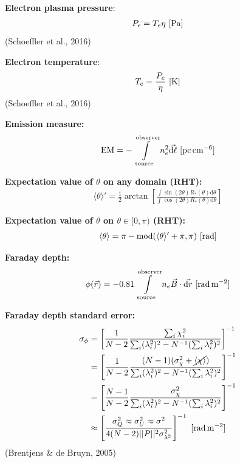 \documentclass[a4paper,10pt]{article}
\begin{document}
{\noindent}\textbf{Electron plasma pressure}:
\begin{align*}
    P_e = T_e \eta ~ [{\rm Pa}]
\end{align*}
(Schoeffler et al., 2016)

{\noindent}\textbf{Electron temperature}:
\begin{align*}
    T_e = \frac{P_e}{\eta} ~ [{\rm K}]
\end{align*}
(Schoeffler et al., 2016)

{\noindent}\textbf{Emission measure:}
\begin{align*}
    {\rm EM} = -\int\limits_\mathrm{source}^\mathrm{observer} n_e^2\vec{{\rm d}\ell} ~ [{\rm pc\,cm^{-6}}]
\end{align*}

{\noindent}\textbf{Expectation value of $\theta$ on any domain (RHT):}
\begin{align*}
    \langle\theta\rangle' = \frac{1}{2}\arctan \left[\frac{\int\sin(2\theta)R_*(\theta)\mathrm{d}\theta}{\int\cos(2\theta)R_*(\theta)\mathrm{d}\theta}\right]
\end{align*}

{\noindent}\textbf{Expectation value of $\theta$ on $\theta\in[0,\pi)$ (RHT):}
\begin{align*}
    \langle\theta\rangle = \pi - {\rm mod}(\langle\theta\rangle'+\pi,\pi) ~ [{\rm rad}]
\end{align*}

{\noindent}\textbf{Faraday depth:} 
\begin{align*}
    \phi(\vec{r}) = -0.81 \int\limits_\mathrm{source}^\mathrm{observer}n_e\vec{B}\cdot\vec{{\rm d}r} ~ [{\rm rad\,m^{-2}}]
\end{align*}

{\noindent}\textbf{Faraday depth standard error:}
\begin{align*}
\sigma_\phi &= \left[ \dfrac{1}{N-2} \dfrac{\sum_i\chi_i^2}{\sum_i(\lambda_i^2)^2 - N^{-1}(\sum_i\lambda_i^2)^2} \right]^{-1} \\
&= \left[ \dfrac{1}{N-2} \dfrac{(N-1)(\sigma_\chi^2 + \cancel{\langle\chi\rangle})}{\sum_i(\lambda_i^2)^2 - N^{-1}(\sum_i\lambda_i^2)^2} \right]^{-1} \\
&= \left[ \dfrac{N-1}{N-2} \dfrac{\sigma_\chi^2}{\sum_i(\lambda_i^2)^2 - N^{-1}(\sum_i\lambda_i^2)^2} \right]^{-1} \\
&\approx \left[ \dfrac{\sigma_Q^2\approx\sigma_U^2\approx\sigma^2}{4(N-2)\lvert\lvert P \rvert\rvert^2\sigma_{\lambda^2}^2} \right]^{-1} ~ [{\rm rad\,m^{-2}}]
\end{align*}
(Brentjens \& de Bruyn, 2005)
\end{document}
